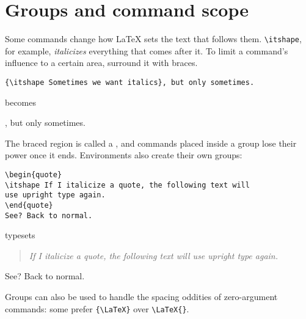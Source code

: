 \section{Groups and command scope}
Some commands change how \LaTeX{} sets the text that follows them.
\verb|\itshape|, for example, \textit{italicizes} everything that comes after it.
To limit a command's influence to a certain area, surround it with braces.
\begin{leftfigure}
\begin{lstlisting}
{\itshape Sometimes we want italics}, but only sometimes.
\end{lstlisting}
\end{leftfigure}
becomes
\begin{leftfigure}
, but only sometimes.
\end{leftfigure}
The braced region is called a ,
and commands placed inside a group lose their power once it ends.
Environments also create their own groups:
\begin{leftfigure}
\begin{lstlisting}
\begin{quote}
\itshape If I italicize a quote, the following text will
use upright type again.
\end{quote}
See? Back to normal.
\end{lstlisting}
\end{leftfigure}
typesets
\begin{leftfigure}
\lm
\begin{quote}
\itshape If I italicize a quote, the following text will
use upright type again.
\end{quote}
See? Back to normal.
\end{leftfigure}
Groups can also be used to handle the spacing oddities of zero-argument
commands: some prefer \verb|{\LaTeX}| over \verb|\LaTeX{}|.
